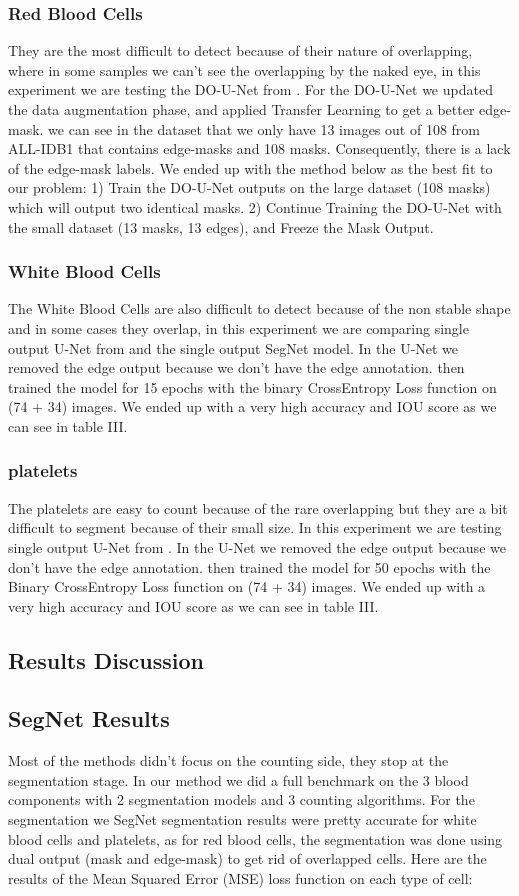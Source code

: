 \documentclass[conference]{IEEEtran}
\begin{document}
\subsubsection{Red Blood Cells}
They are the most difficult to detect because of their nature of overlapping, where in some samples we can’t see the overlapping by the naked eye, in this experiment we are testing the DO-U-Net from \cite{12}. For the DO-U-Net we updated the data augmentation phase, and applied Transfer Learning to get a better edge-mask. we can see in the dataset that we only have 13 images out of 108 from ALL-IDB1 that contains edge-masks and 108 masks. Consequently, there is a lack of the edge-mask labels. We ended up with the method below as the best fit to our problem: 
1) Train the DO-U-Net outputs on the large dataset (108 masks) which will output two identical masks.
2) Continue Training the DO-U-Net with the small dataset (13 masks, 13 edges), and Freeze the Mask Output.
\subsubsection{White Blood Cells}
The White Blood Cells are also difficult to detect because of the non stable shape and in some cases they overlap, in this experiment we are comparing single output U-Net from \cite{12} and the single output SegNet model. In the U-Net we removed the edge output because we don’t have the edge annotation. then trained the model for 15 epochs with the binary CrossEntropy Loss function on (74 + 34) images. We ended up with a very high accuracy and IOU score as we can see in table III.
\subsubsection{platelets}
The platelets are easy to count because of the rare overlapping but they are a bit difficult to segment because of their small size. In this experiment we are testing single output U-Net from \cite{12}. In the U-Net we removed the edge output because we don’t have the edge annotation. then trained the model for 50 epochs with the Binary CrossEntropy Loss function on (74 + 34) images. We ended up with a very high accuracy and IOU score as we can see in table III.
\subsection{Results Discussion}
\subsection{SegNet Results}
Most of the methods didn’t focus on the counting side, they stop at the segmentation stage. In our method we did a full benchmark on the 3 blood components with 2 segmentation models and 3 counting algorithms. For the segmentation we 
SegNet segmentation results were pretty accurate for white blood cells and platelets, as for red blood cells, the segmentation was done using dual output (mask and edge-mask) to get rid of overlapped cells.
Here are the results of the Mean Squared Error (MSE) loss function on each type of cell:
\end{document}
